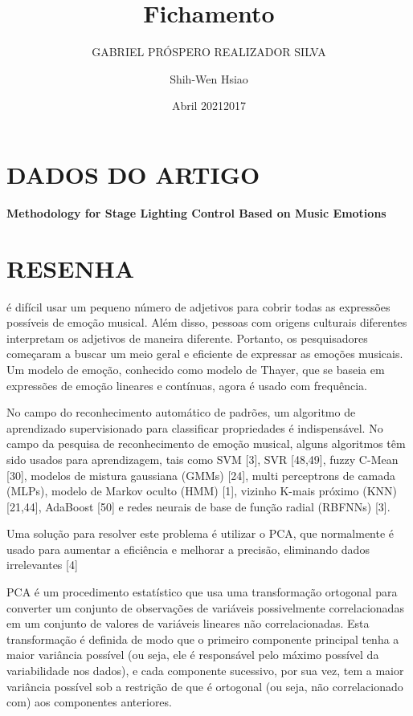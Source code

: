 \documentclass{article}
\title{Fichamento}
\author{GABRIEL PRÓSPERO REALIZADOR  SILVA}
\date{Abril 2021}
\begin{document}
\maketitle

\section{DADOS DO ARTIGO}
\textbf{Methodology for Stage Lighting Control Based on Music Emotions \\}
\author{Shih-Wen Hsiao\\}
\date{2017}

\section{RESENHA}
é difícil usar um pequeno número de adjetivos para cobrir todas as expressões possíveis de emoção musical. Além disso, pessoas com origens culturais diferentes interpretam os adjetivos de maneira diferente. Portanto, os pesquisadores começaram a buscar um meio geral e eficiente de expressar as emoções musicais. Um modelo de emoção, conhecido como modelo de Thayer, que se baseia em expressões de emoção lineares e contínuas, agora é usado com frequência.

No campo do reconhecimento automático de padrões, um algoritmo de aprendizado supervisionado para classificar propriedades é indispensável. No campo da pesquisa de reconhecimento de emoção musical, alguns algoritmos têm sido usados ​​para aprendizagem, tais como SVM [3], SVR [48,49], fuzzy C-Mean [30], modelos de mistura gaussiana (GMMs) [24], multi perceptrons de camada (MLPs), modelo de Markov oculto (HMM) [1], vizinho K-mais próximo (KNN) [21,44], AdaBoost [50] e redes neurais de base de função radial (RBFNNs) [3].

Uma solução para resolver este problema é utilizar o PCA, que normalmente é usado para aumentar a eficiência e melhorar a precisão, eliminando dados irrelevantes [4]

PCA é um procedimento estatístico que usa uma transformação ortogonal para converter um conjunto de observações de variáveis ​​possivelmente correlacionadas em um conjunto de valores de variáveis ​​lineares não correlacionadas.
Esta transformação é definida de modo que o primeiro componente principal tenha a maior variância possível (ou seja, ele é responsável pelo máximo possível da variabilidade nos dados), e cada componente sucessivo, por sua vez, tem a maior variância possível sob a restrição de que é ortogonal (ou seja, não correlacionado com) aos componentes anteriores.
\end{document}
